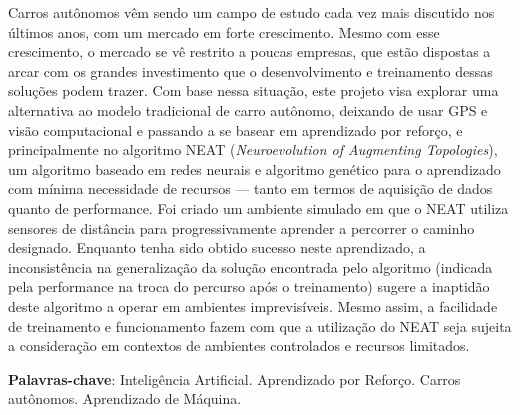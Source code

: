 \setlength{\absparsep}{18pt} %
\begin{resumo}
	Carros autônomos v{\^e}m sendo um campo de estudo cada vez mais discutido
	nos {\'u}ltimos anos, com um mercado em forte crescimento. Mesmo com
	esse crescimento, o mercado se v{\^e} restrito a poucas empresas, que
	est{\~a}o dispostas a arcar com os grandes investimento que o
	desenvolvimento e treinamento dessas solu{\c c}{\~o}es podem trazer. Com
	base nessa situa{\c c}{\~a}o, este projeto visa explorar uma alternativa ao
	modelo tradicional de carro aut{\^o}nomo, deixando de usar GPS e vis{\~a}o
	computacional e passando a se basear em aprendizado por refor{\c c}o, e
	principalmente no algoritmo NEAT (\textit{Neuroevolution of Augmenting
	Topologies}), um algoritmo baseado em redes neurais e algoritmo
	gen{\'e}tico para o aprendizado com m{\'i}nima necessidade de recursos —
	tanto em termos de aquisi{\c c}{\~a}o de dados quanto de performance. Foi
	criado um ambiente simulado em que o NEAT utiliza sensores de
	dist{\^a}ncia para progressivamente aprender a percorrer o caminho
	designado. Enquanto tenha sido obtido sucesso neste aprendizado, a
	inconsist{\^e}ncia na generaliza{\c c}{\~a}o da solu{\c c}{\~a}o encontrada
	pelo algoritmo (indicada pela performance na troca do percurso ap{\'o}s o
	treinamento) sugere a inaptid{\~a}o deste algoritmo a operar em ambientes
	imprevis{\'i}veis. Mesmo assim, a facilidade de treinamento e funcionamento
	fazem com que a utiliza{\c c}{\~a}o do NEAT seja sujeita a considera{\c
	c}{\~a}o em contextos de ambientes controlados e recursos limitados.

	\textbf{Palavras-chave}: Intelig{\^e}ncia Artificial. Aprendizado por Refor{\c c}o. Carros aut{\^o}nomos. Aprendizado de M{\'a}quina.
\end{resumo}

